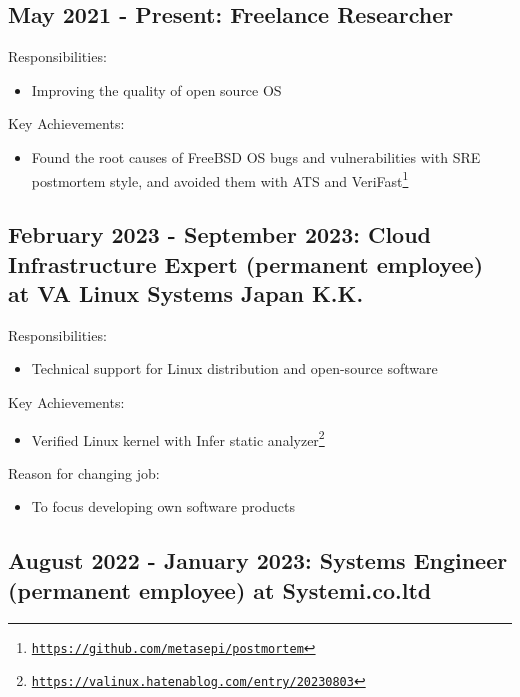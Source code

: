 \documentclass[letterpaper]{article}
\begin{document}
\subsection*{May 2021 - Present: Freelance Researcher}

\noindent Responsibilities:

\begin{itemize}
  \item Improving the quality of open source OS
\end{itemize}

\noindent Key Achievements:

\begin{itemize}
  \item Found the root causes of FreeBSD OS bugs and vulnerabilities with SRE postmortem style, and avoided them with ATS and VeriFast\footnote{\href{https://github.com/metasepi/postmortem}{\tt https://github.com/metasepi/postmortem}}
\end{itemize}

\subsection*{February 2023 - September 2023: Cloud Infrastructure Expert (permanent employee) at VA Linux Systems Japan K.K.}

\noindent Responsibilities:

\begin{itemize}
  \item Technical support for Linux distribution and open-source software
\end{itemize}

\noindent Key Achievements:

\begin{itemize}
  \item Verified Linux kernel with Infer static analyzer\footnote{\href{https://valinux-hatenablog-com.translate.goog/entry/20230803?_x_tr_sl=auto&_x_tr_tl=en}{\tt https://valinux.hatenablog.com/entry/20230803}}
\end{itemize}

\noindent Reason for changing job:

\begin{itemize}
  \item To focus developing own software products
\end{itemize}

\subsection*{August 2022 - January 2023: Systems Engineer (permanent employee) at Systemi.co.ltd}
\end{document}
